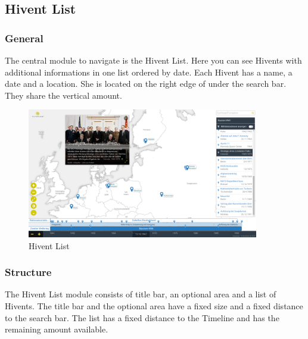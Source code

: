 \subsection{Hivent List} %
\label{sub:hivent_list}

\subsubsection{General} %
\label{ssub:general_hl}
The central module to navigate \HG is the Hivent List. Here you can see Hivents with additional informations in one list ordered by date. Each Hivent has a name, a date and a location. She is located on the right edge of \HG under the search bar. They share the vertical amount.

\begin{figure}[H]
  \centering
  \includegraphics[width=0.9\textwidth]{graphics/final_ui.png}
  \caption{Hivent List}
\end{figure}

\subsubsection{Structure} %
\label{ssub:structure_hl}
The Hivent List module consists of title bar, an optional area and a list of Hivents. The title bar and the optional area have a fixed size and a fixed distance to the search bar. The list has a fixed distance to the Timeline and has the remaining amount available.

